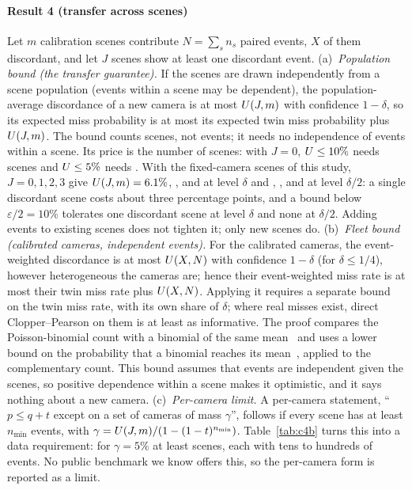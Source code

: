 \paragraph{Result 4 (transfer across scenes)}\label{res:c4} Let $m$ calibration scenes contribute $N=\sum_sn_s$ paired
events, $X$ of them discordant, and let $J$ scenes show at least one discordant event.
(a)~\emph{Population bound (the transfer guarantee).} If the scenes are drawn independently from a scene population (events within a scene may be dependent), the population-average
discordance of a new camera is at most $U(J,m)$ with confidence $1-\delta$, so its expected miss probability is at most
its expected twin miss probability plus $U(J,m)$. The bound counts scenes, not events; it needs no independence of
events within a scene. Its price is the number of scenes: with $J=0$, $U\le10\%$ needs \nPopScenesTen{} scenes and
$U\le5\%$ needs \nPopScenesFive. With the \nMainScenes{} fixed-camera scenes of this study, $J=0,1,2,3$ give
$U(J,m)=6.1\%$, \nUpopJone, \nUpopJtwo{} and \nUpopJthree{} at level $\delta$ and \nUhalfJzero, \nUhalfJone,
\nUhalfJtwo{} and \nUhalfJthree{} at level $\delta/2$: a single discordant scene costs about three percentage points, and a
bound below $\varepsilon/2=10\%$ tolerates one discordant scene at level $\delta$ and none at $\delta/2$. Adding
events to existing scenes does not tighten it; only new scenes do.
(b)~\emph{Fleet bound (calibrated cameras, independent events).} For the calibrated cameras, the event-weighted discordance is at most $U(X,N)$ with confidence
$1-\delta$ (for $\delta\le 1/4$), however heterogeneous the cameras are; hence their event-weighted miss rate is at most
their twin miss rate plus $U(X,N)$. Applying it requires a separate bound on the twin miss rate, with its own share of $\delta$; where real misses exist,
direct Clopper--Pearson on them is at least as informative. The proof compares the Poisson-binomial count with a
binomial of the same mean~\cite{hoeffding1956} and uses a lower bound on the probability that a binomial reaches its mean~\cite{greenberg2014}, applied to the complementary count.
This bound assumes that events are independent given the scenes, so positive dependence within a scene makes
it optimistic, and it says nothing about a new camera.
(c)~\emph{Per-camera limit.} A per-camera statement, ``$p\le q+t$ except on a set of cameras of mass $\gamma$'', follows if
every scene has at least $n_{\min}$ events, with $\gamma=U(J,m)/(1-(1-t)^{n_{\min}})$. Table~\ref{tab:c4b} turns this
into a data requirement: for $\gamma=5\%$ at least \nPopScenesFive{} scenes, each with tens to hundreds of events. No
public benchmark we know offers this, so the per-camera form is reported as a limit.


